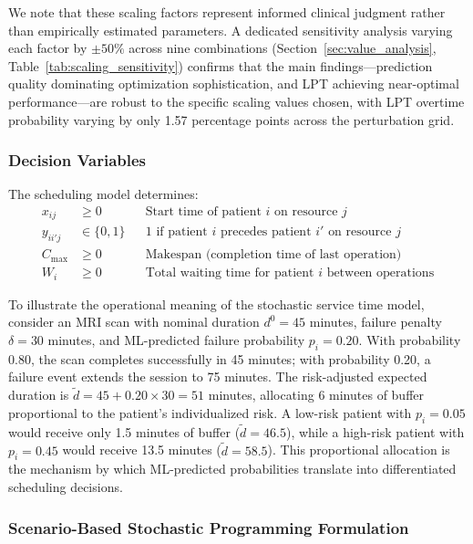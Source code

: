 \documentclass[11pt,a4paper]{article}
\begin{document}
We note that these scaling factors represent informed clinical judgment rather than empirically estimated parameters. A dedicated sensitivity analysis varying each factor by $\pm 50\%$ across nine combinations (Section~\ref{sec:value_analysis}, Table~\ref{tab:scaling_sensitivity}) confirms that the main findings---prediction quality dominating optimization sophistication, and LPT achieving near-optimal performance---are robust to the specific scaling values chosen, with LPT overtime probability varying by only 1.57 percentage points across the perturbation grid.

\subsubsection{Decision Variables}

The scheduling model determines:
\begin{align}
x_{ij} &\geq 0 && \text{Start time of patient } i \text{ on resource } j \\
y_{ii'j} &\in \{0, 1\} && \text{1 if patient } i \text{ precedes patient } i' \text{ on resource } j \\
C_{\max} &\geq 0 && \text{Makespan (completion time of last operation)} \\
W_i &\geq 0 && \text{Total waiting time for patient } i \text{ between operations}
\end{align}


To illustrate the operational meaning of the stochastic service time model, consider an MRI scan with nominal duration $d^0 = 45$ minutes, failure penalty $\delta = 30$ minutes, and ML-predicted failure probability $p_i = 0.20$. With probability 0.80, the scan completes successfully in 45 minutes; with probability 0.20, a failure event extends the session to 75 minutes. The risk-adjusted expected duration is $\tilde{d} = 45 + 0.20 \times 30 = 51$ minutes, allocating 6 minutes of buffer proportional to the patient's individualized risk. A low-risk patient with $p_i = 0.05$ would receive only 1.5 minutes of buffer ($\tilde{d} = 46.5$), while a high-risk patient with $p_i = 0.45$ would receive 13.5 minutes ($\tilde{d} = 58.5$). This proportional allocation is the mechanism by which ML-predicted probabilities translate into differentiated scheduling decisions.


\subsubsection{Scenario-Based Stochastic Programming Formulation}
\end{document}
